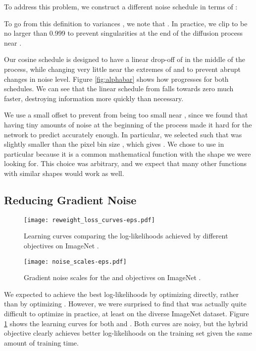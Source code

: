 \documentclass{article}
\begin{document}
To address this problem, we construct a different noise schedule in terms of :

To go from this definition to variances , we note that . In practice, we clip  to be no larger than 0.999 to prevent singularities at the end of the diffusion process near .

Our cosine schedule is designed to have a linear drop-off of  in the middle of the process, while changing very little near the extremes of  and  to prevent abrupt changes in noise level. Figure \ref{fig:alphabar} shows how  progresses for both schedules. We can see that the linear schedule from \citet{ddpm} falls towards zero much faster, destroying information more quickly than necessary.

We use a small offset  to prevent  from being too small near , since we found that having tiny amounts of noise at the beginning of the process made it hard for the network to predict  accurately enough. In particular, we selected  such that  was slightly smaller than the pixel bin size , which gives . We chose to use  in particular because it is a common mathematical function with the shape we were looking for. This choice was arbitrary, and we expect that many other functions with similar shapes would work as well.

\subsection{Reducing Gradient Noise}
\label{sec:gradnoise}

\begin{figure}[ht]
\begin{center}
\centerline{\texttt{[image: reweight\_loss\_curves-eps.pdf]}}
\caption{\label{fig:reweightlosscurves} Learning curves comparing the log-likelihoods achieved by different objectives on ImageNet .}
\end{center}
\vskip -0.4in
\end{figure}


\begin{figure}[ht]
\vskip 0.2in
\begin{center}
\centerline{\texttt{[image: noise\_scales-eps.pdf]}}
\caption{\label{fig:noisescales} Gradient noise scales for the  and  objectives on ImageNet .}
\end{center}
\vskip -0.2in
\end{figure}

We expected to achieve the best log-likelihoods by optimizing  directly, rather than by optimizing . However, we were surprised to find that  was actually quite difficult to optimize in practice, at least on the diverse ImageNet  dataset. Figure \ref{fig:reweightlosscurves} shows the learning curves for both  and . Both curves are noisy, but the hybrid objective clearly achieves better log-likelihoods on the training set given the same amount of training time.
\end{document}
